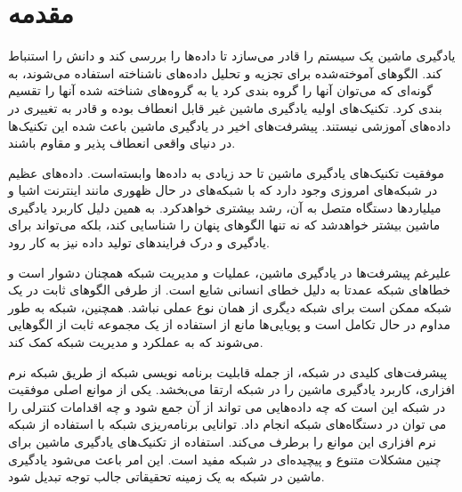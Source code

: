 \chapter{مقدمه}

یادگیری ماشین یک سیستم را قادر می‌سازد تا داده‌ها را بررسی کند و دانش را استنباط کند. الگوهای آموخته‌شده برای تجزیه و تحلیل داده‌های ناشناخته استفاده می‌شوند، به گونه‌ای که می‌توان آنها را گروه بندی کرد یا به گروه‌های شناخته شده آنها را تقسیم بندی کرد. تکنیک‌های اولیه یادگیری ماشین غیر قابل انعطاف بوده و قادر به تغییری در داده‌های آموزشی نیستند. پیشرفت‌های اخیر در یادگیری ماشین باعث شده این تکنیک‌ها در دنیای واقعی انعطاف پذیر و مقاوم باشند.


موفقیت تکنیک‌های یادگیری ماشین تا حد زیادی به داده‌ها وابسته‌است. داده‌های عظیم در شبکه‌های امروزی وجود دارد که با شبکه‌های در حال ظهوری مانند اینترنت اشیا و میلیاردها دستگاه متصل به آن، رشد بیشتری خواهدکرد. به همین دلیل کاربرد یادگیری ماشین بیشتر خواهدشد که نه تنها الگوهای پنهان را شناسایی کند، بلکه می‌تواند برای یادگیری و درک فرایندهای تولید داده نیز به کار رود.


علیرغم پیشرفت‌ها در یادگیری ماشین، عملیات و مدیریت شبکه همچنان دشوار است و خطاهای شبکه عمدتا به دلیل خطای انسانی شایع است. از طرفی الگوهای ثابت در یک شبکه ممکن است برای شبکه دیگری از همان نوع عملی نباشد. همچنین، شبکه به طور مداوم در حال تکامل است و پویایی‌ها مانع از استفاده از یک مجموعه ثابت از الگوهایی می‌شوند که به عملکرد و مدیریت شبکه کمک کند.


پیشرفت‌های کلیدی در شبکه، از جمله قابلیت برنامه نویسی شبکه از طریق شبکه نرم افزاری، کاربرد یادگیری ماشین را در شبکه ارتقا می‌بخشد. یکی از موانع اصلی موفقیت در شبکه‌ این است که چه داده‌هایی می تواند از آن جمع شود و چه اقدامات کنترلی را می توان در دستگاه‌های شبکه انجام داد. توانایی برنامه‌ریزی شبکه با استفاده از شبکه نرم افزاری این موانع را برطرف می‌کند. استفاده از تکنیک‌های یادگیری ماشین برای چنین مشکلات متنوع و پیچیده‌ای در شبکه مفید است. این امر باعث می‌شود یادگیری ماشین در شبکه به یک زمینه تحقیقاتی جالب توجه تبدیل شود\cite{boutaba2018comprehensive}.



\newpage



